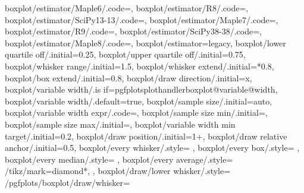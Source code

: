 {	boxplot/estimator/Maple6/.code={\def\pgfplots@boxplot@estimator{R7}},
	boxplot/estimator/R8/.code={\def\pgfplots@boxplot@estimator{R8}},
	boxplot/estimator/SciPy13-13/.code={\def\pgfplots@boxplot@estimator{R8}},
	boxplot/estimator/Maple7/.code={\def\pgfplots@boxplot@estimator{R8}},
	boxplot/estimator/R9/.code={\def\pgfplots@boxplot@estimator{R9}},
	boxplot/estimator/SciPy38-38/.code={\def\pgfplots@boxplot@estimator{R9}},
	boxplot/estimator/Maple8/.code={\def\pgfplots@boxplot@estimator{R9}},
	boxplot/estimator=legacy,
	boxplot/lower quartile off/.initial=0.25,
	boxplot/upper quartile off/.initial=0.75,
	boxplot/whisker range/.initial=1.5,
	boxplot/whisker extend/.initial=*0.8,
	boxplot/box extend/.initial=0.8,
	boxplot/draw direction/.initial=x,	
	boxplot/variable width/.is if=pgfplotsplothandlerboxplot@variable@width,
	boxplot/variable width/.default=true,
	boxplot/sample size/.initial=auto,
	boxplot/variable width expr/.code=,
	boxplot/sample size min/.initial=,
	boxplot/sample size max/.initial=,
	boxplot/variable width min target/.initial=0.2,
	boxplot/draw position/.initial=1+\plotnumofactualtype,
	boxplot/draw relative anchor/.initial=0.5,
	boxplot/every whisker/.style={%
	},
	boxplot/every box/.style={%
	},
	boxplot/every median/.style={%
	},
	boxplot/every average/.style={%
		/tikz/mark=diamond*,
	},
	boxplot/draw/lower whisker/.style={%
		/pgfplots/boxplot/draw/whisker=%
			{}
}}
